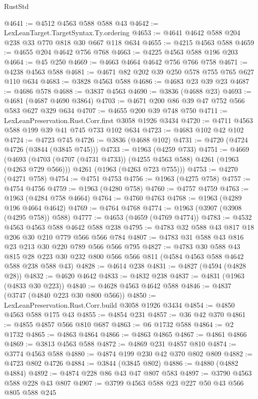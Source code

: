 \begin{lexlean}{RustStd}
\begin{coremodule}
@4641 := @4512 @4563 @588 @588 @43
@4642 := LexLeanTarget.TargetSyntax.Ty.ordering
@4653 := @4641 @4642 @588 @204 @238 @33 @770 @818 @30 @667 @118 @634
@4655 := @4215 @4563 @588
@4659 := @4655 @204 @4642 @756 @768
@4663 := @4225 @4563 @588 @196 @203
@4664 := @45 @250
@4669 := @4663 @4664 @4642 @756 @766 @758
@4671 := @4238 @4563 @588
@4681 := @4671 @82 @202 @39 @250 @578 @755 @765 @627 @110 @634
@4683 := @3828 @4563 @588
@4686 := @4683 @23 @39 @23
@4687 := @4686 @578
@4688 := @3837 @4563
@4690 := @3836 (@4688 @23)
@4693 := @4681 (@4687 @4690 @3864)
@4703 := @4671 @200 @86 @39 @47 @752 @566 @583 @627 @329 @634
@4707 := @4655 @200 @39 @748 @750
@4711 := LexLeanPreservation.Rust.Corr.first @3058 @1926 @3434
@4720 := @4711 @4563 @588 @199 @39 @41 @745 @733 @102 @634
@4723 := @4683 @102 @42 @102
@4724 := @4723 @745
@4726 := @3836 (@4688 @102)
@4731 := @4720 (@4724 @4726 (@3844 (@3845 @745)))
@4733 := @1963 (@4259 @733)
@4751 := @4669
    (@4693
      (@4703 (@4707 (@4731 @4733)) (@4255 @4563 @588) @4261 (@1963 (@4263 @729 @566)))
      @4261
      (@1963 (@4263 @723 @755)))
@4753 := @4270 (@4271 @758)
@4754 := @4751 @4753
@4756 := @1963 (@4275 @758)
@4757 := @4754 @4756
@4759 := @1963 (@4280 @758)
@4760 := @4757 @4759
@4763 := @1963 (@4284 @758 @4664)
@4764 := @4760 @4763
@4768 := @1963 (@4289 @196 @4664 @4642)
@4769 := @4764 @4768
@4774 := @1963 (@3907 (@3908 (@4295 @758)) @588)
@4777 := @4653 (@4659 (@4769 @4774))
@4783 := @4532 @4563 @4563 @588 @4642 @588 @238
@4795 := @4783 @32 @588 @43 @817 @18 @206 @30 @210 @779 @566 @566 @784
@4807 := @4783 @31 @588 @43 @816 @23 @213 @30 @220 @789 @566 @566 @795
@4827 := @4783
    @30
    @588
    @43
    @815
    @28
    @223
    @30
    @232
    @800
    @566
    @566
    @811
    (@4584 @4563 @588 @4642 @588 @238 @588 @43)
@4828 := @4614 @238
@4831 := @4827 (@4594 (@4828 @28))
@4832 := @4620 @4642
@4833 := @4832 @238
@4837 := @4831 (@1963 (@4833 @30 @223))
@4840 := @4628 @4563 @4642 @588
@4846 := @4837 (@3747 (@4840 @223 @30 @800 @566))
@4850 := LexLeanPreservation.Rust.Corr.build @3058 @1926 @3434
@4854 := @4850 @4563 @588 @175 @43
@4855 := @4854 @231
@4857 := @36 @42 @370
@4861 := @4855 @4857 @566 @810 @687
@4863 := @6 @1732 @588
@4864 := @2 @1732
@4865 := @4863 @4864
@4866 := @4863 @4865
@4867 := @4861 @4866
@4869 := @3813 @4563 @588
@4872 := @4869 @231 @4857 @810
@4874 := @3774 @4563 @588
@4880 := @4874 @199 @230 @42 @370 @802 @809
@4882 := @4723 @802 @4726
@4884 := @3844 (@3845 @802)
@4886 := @4880 (@4882 @4884)
@4892 := @4874 @228 @86 @43 @47 @807 @583
@4897 := @3790 @4563 @588 @228 @43 @807
@4907 := @3799 @4563 @588 @23 @227 @50 @43 @566 @805 @588 @245

\end{coremodule}
\end{lexlean}
